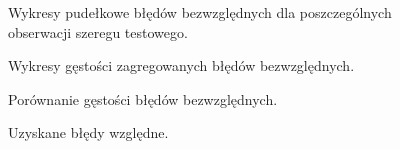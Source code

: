 \documentclass[11pt]{report}
\begin{document}
\begin{figure}[H]
    \centering
    \begin{subfigure}[b]{0.3\textwidth}
        \centering
        \def\svgwidth{\columnwidth}
        
    \end{subfigure}
    \begin{subfigure}[b]{0.3\textwidth}
        \centering
        \def\svgwidth{\columnwidth}
        
    \end{subfigure}
    \begin{subfigure}[b]{0.3\textwidth}
        \centering
        \def\svgwidth{\columnwidth}
        
    \end{subfigure}
     \caption{Wykresy pudełkowe błędów bezwzględnych dla poszczególnych obserwacji szeregu testowego.}
\end{figure}

\begin{figure}[H]
    \centering
    \begin{subfigure}[b]{0.3\textwidth}
        \centering
        \def\svgwidth{\columnwidth}
        
    \end{subfigure}
    \begin{subfigure}[b]{0.3\textwidth}
        \centering
        \def\svgwidth{\columnwidth}
        
    \end{subfigure}
    \begin{subfigure}[b]{0.3\textwidth}
        \centering
        \def\svgwidth{\columnwidth}
        
    \end{subfigure}
     \caption{Wykresy gęstości zagregowanych błędów bezwzględnych.}
\end{figure}

\begin{figure}[H]
    \centering
    \centering
    \def\svgwidth{\columnwidth}
    
    \caption{Porównanie gęstości błędów bezwzględnych.}
\end{figure}


\begin{figure}[H]
    \centering
    \begin{subfigure}[b]{0.3\textwidth}
        \centering
        \def\svgwidth{\columnwidth}
        
    \end{subfigure}
    \begin{subfigure}[b]{0.3\textwidth}
        \centering
        \def\svgwidth{\columnwidth}
        
    \end{subfigure}
    \begin{subfigure}[b]{0.3\textwidth}
        \centering
        \def\svgwidth{\columnwidth}
        
    \end{subfigure}
     \caption{Uzyskane błędy względne.}
\end{figure}
\end{document}
